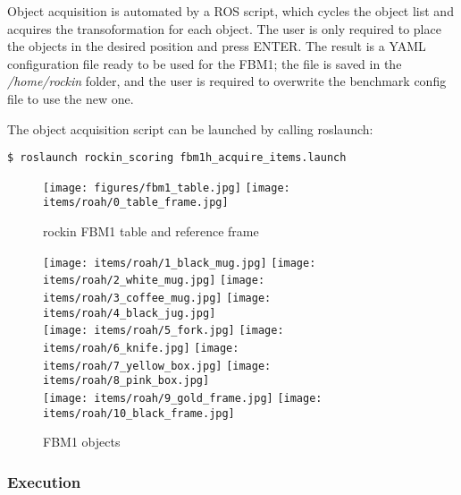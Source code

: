 \documentclass[a4paper]{article}
\begin{document}
Object acquisition is automated by a ROS script, which cycles the object list and acquires the transoformation for each object.
The user is only required to place the objects in the desired position and press ENTER.
The result is a YAML configuration file ready to be used for the FBM1; the file is saved in the \emph{/home/rockin} folder, and the user is required to overwrite the benchmark config file to use the new one.

The object acquisition script can be launched by calling roslaunch:
\begin{verbatim}
$ roslaunch rockin_scoring fbm1h_acquire_items.launch
\end{verbatim} 

\begin{figure}
  \begin{center}
    \texttt{[image: figures/fbm1\_table.jpg]}
    \hspace{0.5cm}
    \texttt{[image: items/roah/0\_table\_frame.jpg]}
  \end{center}
  \caption{rockin FBM1 table and reference frame}
\end{figure}

\begin{figure}
  \begin{center}
    \texttt{[image: items/roah/1\_black\_mug.jpg]}
    \texttt{[image: items/roah/2\_white\_mug.jpg]}
    \texttt{[image: items/roah/3\_coffee\_mug.jpg]}
    \texttt{[image: items/roah/4\_black\_jug.jpg]}\\
    \texttt{[image: items/roah/5\_fork.jpg]}
    \texttt{[image: items/roah/6\_knife.jpg]}
    \texttt{[image: items/roah/7\_yellow\_box.jpg]}
    \texttt{[image: items/roah/8\_pink\_box.jpg]}\\
    \texttt{[image: items/roah/9\_gold\_frame.jpg]}
    \texttt{[image: items/roah/10\_black\_frame.jpg]}
  \end{center}
  \caption{\ro@Home FBM1 objects}
\end{figure}


\subsubsection{Execution}
\end{document}

